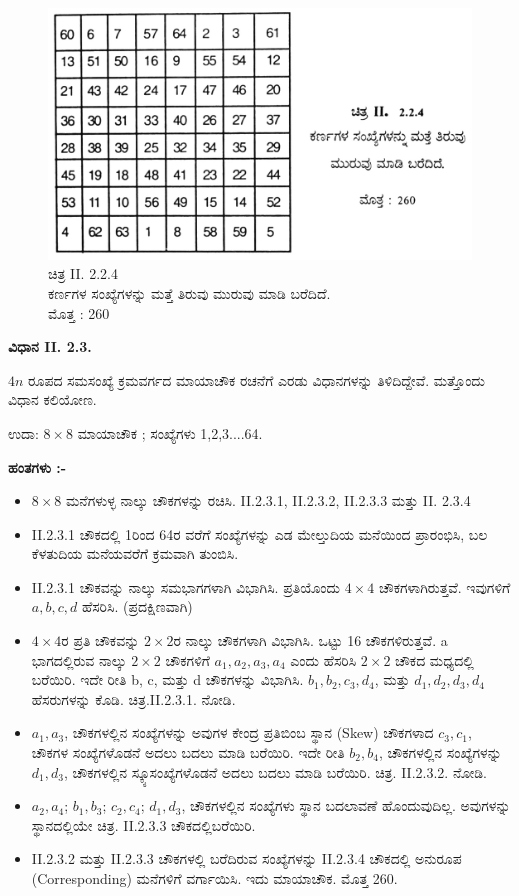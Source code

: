 \begin{itemize}
\begin{figure}[H]
	\end{figure}
	\begin{figure}[H]
	\includegraphics[scale=.8]{src/figures/chap3/fig3.23.jpg}
	\caption{ಚಿತ್ರ II. 2.2.4 \\ ಕರ್ಣಗಳ ಸಂಖ್ಯೆಗಳನ್ನು ಮತ್ತೆ ತಿರುವು ಮುರುವು ಮಾಡಿ ಬರೆದಿದೆ. \\ ಮೊತ್ತ : 260}
	\end{figure}
\end{itemize}
\textbf{ವಿಧಾನ II. 2.3.}

$4n$ ರೂಪದ ಸಮಸಂಖ್ಯೆ ಕ್ರಮವರ್ಗದ ಮಾಯಾಚೌಕ ರಚನೆಗೆ ಎರಡು ವಿಧಾನಗಳನ್ನು ತಿಳಿದಿದ್ದೇವೆ. ಮತ್ತೊಂದು ವಿಧಾನ ಕಲಿಯೋಣ.

ಉದಾ: $8 \times 8$ ಮಾಯಾಚೌಕ ; ಸಂಖ್ಯೆಗಳು 1,2,3....64.

\smallskip
\textbf{ಹಂತಗಳು :-}
\begin{itemize}
	\item $8 \times 8$ ಮನೆಗಳುಳ್ಳ ನಾಲ್ಕು ಚೌಕಗಳನ್ನು ರಚಿಸಿ. II.2.3.1, II.2.3.2, II.2.3.3 ಮತ್ತು II. 2.3.4
	\item II.2.3.1 ಚೌಕದಲ್ಲಿ 1ರಿಂದ 64ರ ವರೆಗೆ ಸಂಖ್ಯೆಗಳನ್ನು ಎಡ ಮೇಲ್ತುದಿಯ ಮನೆಯಿಂದ ಪ್ರಾರಂಭಿಸಿ, ಬಲ ಕೆಳತುದಿಯ ಮನೆಯವರೆಗೆ ಕ್ರಮವಾಗಿ ತುಂಬಿಸಿ.
	\item II.2.3.1 ಚೌಕವನ್ನು ನಾಲ್ಕು ಸಮಭಾಗಗಳಾಗಿ ವಿಭಾಗಿಸಿ. ಪ್ರತಿಯೊಂದು $4 \times 4$ ಚೌಕಗಳಾಗಿರುತ್ತವೆ. ಇವುಗಳಿಗೆ $a, b, c, d$ ಹೆಸರಿಸಿ. (ಪ್ರದಕ್ಷಿಣವಾಗಿ)
	\item $4 \times 4$ರ ಪ್ರತಿ ಚೌಕವನ್ನು $2 \times 2$ರ ನಾಲ್ಕು ಚೌಕಗಳಾಗಿ ವಿಭಾಗಿಸಿ. ಒಟ್ಟು 16 ಚೌಕಗಳಿರುತ್ತವೆ. a ಭಾಗದಲ್ಲಿರುವ ನಾಲ್ಕು $2 \times 2$ ಚೌಕಗಳಿಗೆ $a_1, a_2, a_3, a_4$ ಎಂದು ಹೆಸರಿಸಿ $2 \times 2$ ಚೌಕದ ಮಧ್ಯದಲ್ಲಿ ಬರೆಯಿರಿ. ಇದೇ ರೀತಿ b, c, ಮತ್ತು d ಚೌಕಗಳನ್ನು ವಿಭಾಗಿಸಿ. $b_1, b_2, c_3, d_4$, ಮತ್ತು $d_1, d_2, d_3, d_4$ ಹೆಸರುಗಳನ್ನು ಕೊಡಿ. ಚಿತ್ರ.II.2.3.1. ನೋಡಿ.
	\item $a_1, a_3$, ಚೌಕಗಳಲ್ಲಿನ ಸಂಖ್ಯೆಗಳನ್ನು ಅವುಗಳ ಕೇಂದ್ರ ಪ್ರತಿಬಿಂಬ ಸ್ಥಾನ (Skew) ಚೌಕಗಳಾದ $c_3, c_1$, ಚೌಕಗಳ ಸಂಖ್ಯೆಗಳೊಡನೆ ಅದಲು ಬದಲು ಮಾಡಿ ಬರೆ\-ಯಿರಿ. ಇದೇ ರೀತಿ $b_2, b_4$, ಚೌಕಗಳಲ್ಲಿನ ಸಂಖ್ಯೆಗಳನ್ನು $d_1, d_3$, ಚೌಕಗಳಲ್ಲಿನ ಸ್ಕ್ಯೂ\break  ಸಂಖ್ಯೆಗಳೊಡನೆ ಅದಲು ಬದಲು ಮಾಡಿ ಬರೆಯಿರಿ. ಚಿತ್ರ. II.2.3.2. ನೋಡಿ.
	\item $a_2, a_4$; $b_1, b_3$; $c_2, c_4$; $d_1, d_3$, ಚೌಕಗಳಲ್ಲಿನ ಸಂಖ್ಯೆಗಳು ಸ್ಥಾನ ಬದ\-ಲಾವಣೆ ಹೊಂದುವುದಿಲ್ಲ. ಅವುಗಳನ್ನು ಸ್ಥಾನದಲ್ಲಿಯೇ ಚಿತ್ರ. II.2.3.3 ಚೌಕದಲ್ಲಿ\break ಬರೆಯಿರಿ.
	\item II.2.3.2 ಮತ್ತು II.2.3.3 ಚೌಕಗಳಲ್ಲಿ ಬರೆದಿರುವ ಸಂಖ್ಯೆಗಳನ್ನು II.2.3.4 ಚೌಕದಲ್ಲಿ ಅನುರೂಪ (Corresponding) ಮನೆಗಳಿಗೆ ವರ್ಗಾಯಿಸಿ. ಇದು ಮಾಯಾಚೌಕ. ಮೊತ್ತ 260.
\end{itemize}

